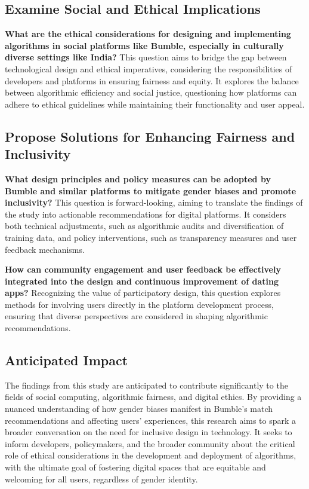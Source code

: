 \subsection{Examine Social and Ethical Implications}
\textbf{What are the ethical considerations for designing and implementing algorithms in social platforms like Bumble, especially in culturally diverse settings like India?}
This question aims to bridge the gap between technological design and ethical imperatives, considering the responsibilities of developers and platforms in ensuring fairness and equity. It explores the balance between algorithmic efficiency and social justice, questioning how platforms can adhere to ethical guidelines while maintaining their functionality and user appeal.

\subsection{Propose Solutions for Enhancing Fairness and Inclusivity}
\textbf{What design principles and policy measures can be adopted by Bumble and similar platforms to mitigate gender biases and promote inclusivity?}
This question is forward-looking, aiming to translate the findings of the study into actionable recommendations for digital platforms. It considers both technical adjustments, such as algorithmic audits and diversification of training data, and policy interventions, such as transparency measures and user feedback mechanisms.

\textbf{ How can community engagement and user feedback be effectively integrated into the design and continuous improvement of dating apps?}
Recognizing the value of participatory design, this question explores methods for involving users directly in the platform development process, ensuring that diverse perspectives are considered in shaping algorithmic recommendations.

\subsection{Anticipated Impact}
The findings from this study are anticipated to contribute significantly to the fields of social computing, algorithmic fairness, and digital ethics. By providing a nuanced understanding of how gender biases manifest in Bumble’s match recommendations and affecting users’ experiences, this research aims to spark a broader conversation on the need for inclusive design in technology. It seeks to inform developers, policymakers, and the broader community about the critical role of ethical considerations in the development and deployment of algorithms, with the ultimate goal of fostering digital spaces that are equitable and welcoming for all users, regardless of gender identity.

